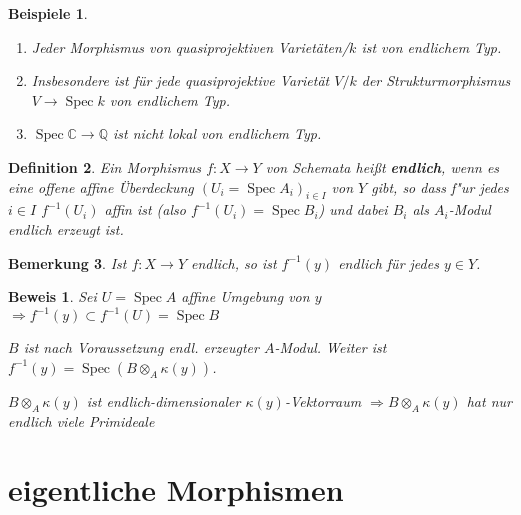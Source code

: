 \documentclass[paper = A4, fontsize=12pt, numbers=noendperiod, chapterprefix=true]{scrbook}
\theoremstyle{break}
\newtheorem{Def}{Definition}[section]
\newtheorem{Bem}[Def]{Bemerkung}
\newtheorem{Bspe}[Def]{Beispiele}
\theoremstyle{nonumberbreak}
\newtheorem{bew}{Beweis}
\theoremstyle{nonumberplain}
\newcommand{\quot}[1]{\textrm{\glqq}{#1}\textrm{\grqq}}
\newcommand{\emp}[1]{\textbf{\emph{#1}}}
\newcommand{\defterm}[1]{{\index{#1}}\emp{#1}}
\DeclareMathOperator{\Spec}{Spec}
\newcommand{\C}{\mathbb{C}}
\newcommand{\Q}{\mathbb{Q}}
\begin{document}
\begin{Bspe}\begin{enumerate}[1)]
\item
	Jeder Morphismus von quasiprojektiven Variet\"aten/$k$ ist von endlichem Typ.
\item
	Insbesondere ist f\"ur jede quasiprojektive Variet\"at $V/k$ der \quot{Strukturmorphismus} $V \to \Spec k$ von endlichem Typ.
\item
	$\Spec \C \to \Q$ ist nicht lokal von endlichem Typ.
\end{enumerate}\end{Bspe}

\begin{Def}
Ein Morphismus $f: X \to Y$ von Schemata hei\ss t \defterm{endlich}, wenn es eine offene affine \"Uberdeckung $(U_i = \Spec A_i)_{i\in I}$ von $Y$ gibt, so dass f"ur jedes $i \in I$ $f^{-1}(U_i)$ affin ist (also $f^{-1}(U_i) = \Spec B_i$) und dabei $B_i$ als $A_i$-Modul endlich erzeugt ist.
\end{Def}

\begin{Bem}
Ist $f: X \to Y$ endlich, so ist $f^{-1}(y)$ endlich f\"ur jedes $y \in Y$.
\end{Bem}

\begin{bew}
Sei $U = \Spec A$ affine Umgebung von $y$ $\Rightarrow f^{-1}(y) \subset f^{-1}(U) = \Spec B$

$B$ ist nach Voraussetzung endl. erzeugter $A$-Modul. Weiter ist $f^{-1}(y) = \Spec (B \otimes_A \kappa(y))$.

$B \otimes_A \kappa(y)$ ist endlich-dimensionaler $\kappa(y)$-Vektorraum $\Rightarrow B \otimes_A \kappa(y)$ hat nur endlich viele Primideale
\end{bew}

\newpage


\section{eigentliche Morphismen}
\end{document}
